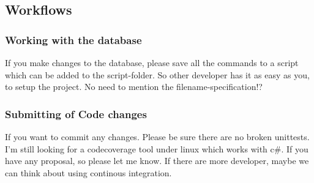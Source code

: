 \documentclass{article}
\begin{document}
\subsection{Workflows}
\subsubsection{Working with the database}
If you make changes to the database, please save all the commands to a script
which can be added to the script-folder. So other developer has it as easy as
you, to setup the project. No need to mention the filename-specification!?
\subsubsection{Submitting of Code changes}
If you want to commit any changes. Please be sure there are no broken unittests.
I'm still looking for a codecoverage tool under linux which works with c\#. If
you have any proposal, so please let me know. If there are more developer, maybe
we can think about using continous integration.
\end{document}

